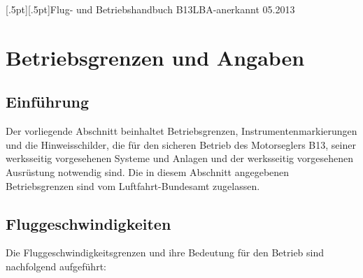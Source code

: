 [.5pt][.5pt]{\pagemark}{}{\headmark}{Flug- und Betriebshandbuch B13}{}{LBA-anerkannt 05.2013}
\pagestyle{Flughandbuch}
\renewcommand*\chapterpagestyle{Flughandbuch}


\chapter{Betriebsgrenzen und Angaben}

\section{Einführung}
Der vorliegende Abschnitt beinhaltet Betriebsgrenzen, Instrumentenmarkierungen und die Hinweisschilder, die für den sicheren Betrieb des Motorseglers B13, seiner werksseitig vorgesehenen Systeme und Anlagen und der werksseitig vorgesehenen Ausrüstung notwendig sind. Die in diesem Abschnitt angegebenen Betriebsgrenzen sind vom Luftfahrt-Bundesamt zugelassen.

\section{Fluggeschwindigkeiten}

Die Fluggeschwindigkeitsgrenzen und ihre Bedeutung für den Betrieb sind nachfolgend aufgeführt:

